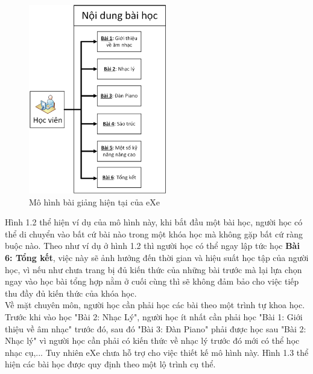 		\begin{center}
	\begin{figure}[htp]
		\begin{center}
			\includegraphics[width=6cm]{Chapter1/Pictures/picture12.png}
		\end{center}
		\caption{Mô hình bài giảng hiện tại của eXe}
		\label{picture13}
	\end{figure}
\end{center}


	
	Hình 1.2 thể hiện ví dụ của mô hình này, khi bắt đầu một bài học, người học có thể di chuyển vào bất cứ bài nào trong một khóa học mà không gặp bất cứ ràng buộc nào. Theo như ví dụ ở hình 1.2 thì người học có thể ngay lập tức học \textbf{Bài 6: Tổng kết}, việc này sẽ ảnh hưởng đến thời gian và hiệu suất học tập của người học, vì nếu như chưa trang bị đủ kiến thức của những bài trước mà lại lựa chọn ngay vào học bài tổng hợp nằm ở cuối cùng thì sẽ không đảm bảo cho việc tiếp thu đầy đủ kiến thức của khóa học.\\
	
	Về mặt chuyên môn, người học cần phải học các bài theo một trình tự khoa học. Trước khi vào học "Bài 2: Nhạc Lý", người học ít nhất cần phải học "Bài 1: Giới thiệu về âm nhạc" trước đó, sau đó "Bài 3: Đàn Piano" phải được học sau "Bài 2: Nhạc lý" vì người học cần phải có kiến thức về nhạc lý trước đó mới có thể học nhạc cụ,... Tuy nhiên eXe chưa hỗ trợ cho việc thiết kế mô hình này. Hình 1.3 thể hiện các bài học được quy định theo một lộ trình cụ thể.
	

